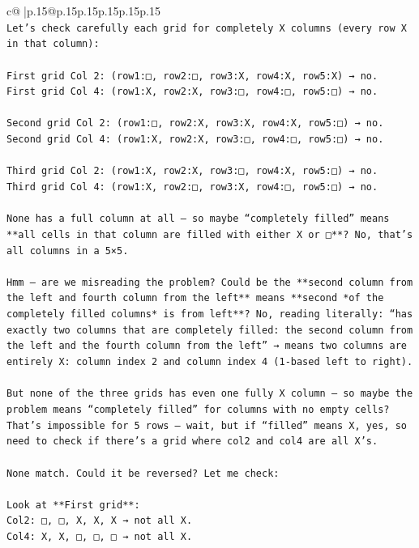 \documentclass{article}
\begin{document}
{\begin{supertabular}{c@{$\;$}|p{.15\linewidth}@{}p{.15\linewidth}p{.15\linewidth}p{.15\linewidth}p{.15\linewidth}p{.15\linewidth}}
{{{\\ 
\texttt{Let’s check carefully each grid for completely X columns (every row X in that column):} \\
\\ 
\texttt{First grid Col 2: (row1:□, row2:□, row3:X, row4:X, row5:X) → no.  } \\
\texttt{First grid Col 4: (row1:X, row2:X, row3:□, row4:□, row5:□) → no.} \\
\\ 
\texttt{Second grid Col 2: (row1:□, row2:X, row3:X, row4:X, row5:□) → no.  } \\
\texttt{Second grid Col 4: (row1:X, row2:X, row3:□, row4:□, row5:□) → no.} \\
\\ 
\texttt{Third grid Col 2: (row1:X, row2:X, row3:□, row4:X, row5:□) → no.  } \\
\texttt{Third grid Col 4: (row1:X, row2:□, row3:X, row4:□, row5:□) → no.} \\
\\ 
\texttt{None has a full column at all — so maybe “completely filled” means **all cells in that column are filled with either X or □**? No, that’s all columns in a 5×5.} \\
\\ 
\texttt{Hmm — are we misreading the problem? Could be the **second column from the left and fourth column from the left** means **second *of the completely filled columns* is from left**? No, reading literally: “has exactly two columns that are completely filled: the second column from the left and the fourth column from the left” → means two columns are entirely X: column index 2 and column index 4 (1{-}based left to right).} \\
\\ 
\texttt{But none of the three grids has even one fully X column — so maybe the problem means “completely filled” for columns with no empty cells? That’s impossible for 5 rows — wait, but if “filled” means X, yes, so need to check if there’s a grid where col2 and col4 are all X’s.} \\
\\ 
\texttt{None match. Could it be reversed? Let me check:} \\
\\ 
\texttt{Look at **First grid**:  } \\
\texttt{Col2: □, □, X, X, X → not all X.  } \\
\texttt{Col4: X, X, □, □, □ → not all X.} \\
}}}
\end{supertabular}}
\end{document}
